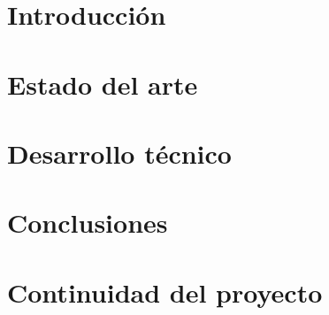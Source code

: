 \chapter[Introducción]{Introducción}


\chapter[Estado del arte]{Estado del arte}

\chapter[Desarrollo técnico]{Desarrollo técnico}

\chapter[Conclusiones]{Conclusiones}

\chapter[Continuidad del proyecto]{Continuidad del proyecto}
